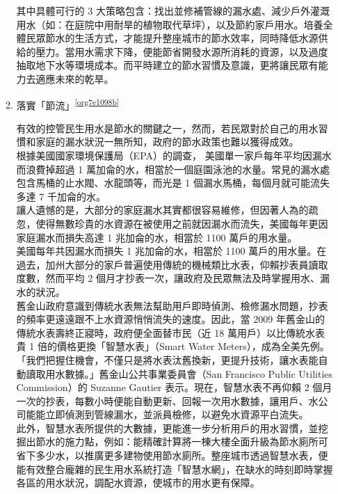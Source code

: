 \documentclass[a4paper,12pt]{article}
\begin{document}
\begin{enumerate}
\begin{enumerate}
其中具體可行的 3 大策略包含：找出並修補管線的漏水處、減少戶外灌溉用水（如：在庭院中用耐旱的植物取代草坪），以及節約家戶用水。培養全體民眾節水的生活方式，才能提升整座城市的節水效率，同時降低水源供給的壓力。當用水需求下降，便能節省開發水源所消耗的資源，以及過度抽取地下水等環境成本。而平時建立的節水習慣及意識，更將讓民眾有能力去適應未來的乾旱。\\

\item 落實「節流」\textsuperscript{\ref{org7e1098b}}
\label{sec:org08d655e}

有效的控管民生用水是節水的關鍵之一，然而，若民眾對於自己的用水習慣和家庭的漏水狀況一無所知，政府的節水政策也難以獲得成效。\\

根據美國國家環境保護局（EPA）的調查， 美國單一家戶每年平均因漏水而浪費掉超過 1 萬加侖的水，相當於一個庭園泳池的水量。常見的漏水處包含馬桶的止水閥、水龍頭等，而光是 1 個漏水馬桶，每個月就可能流失多達 7 千加侖的水。\\

讓人遺憾的是，大部分的家庭漏水其實都很容易維修，但因著人為的疏忽，使得無數珍貴的水資源在被使用之前就因漏水而流失，美國每年更因家庭漏水而損失高達 1 兆加侖的水，相當於 1100 萬戶的用水量。\\

美國每年共因漏水而損失 1 兆加侖的水，相當於 1100 萬戶的用水量。在過去，加州大部分的家戶普遍使用傳統的機械類比水表，仰賴抄表員讀取度數，然而平均 2 個月才抄表一次，讓政府及民眾無法及時掌握用水、漏水的狀況。\\

舊金山政府意識到傳統水表無法幫助用戶即時偵測、檢修漏水問題，抄表的頻率更遠遠跟不上水資源悄悄流失的速度。因此，當 2009 年舊金山的傳統水表壽終正寢時，政府便全面替市民（近 18 萬用戶）以比傳統水表貴 1 倍的價格更換「智慧水表」（Smart Water Meters），成為全美先例。\\

「我們把握住機會，不僅只是將水表汰舊換新，更提升技術，讓水表能自動讀取用水數據。」舊金山公共事業委員會（San Francisco Public Utilities Commission）的 Suzanne Gautier 表示。現在，智慧水表不再仰賴 2 個月一次的抄表，每數小時便能自動更新、回報一次用水數據，讓用戶、水公司能能立即偵測到管線漏水，並派員檢修，以避免水資源平白流失。\\

此外，智慧水表所提供的大數據，更能進一步分析用戶的用水習慣，並挖掘出節水的施力點，例如：能精確計算將一棟大樓全面升級為節水廁所可省下多少水，以推廣更多建物使用節水廁所。整座城市透過智慧水表，便能有效整合龐雜的民生用水系統打造「智慧水網」，在缺水的時刻即時掌握各區的用水狀況，調配水資源，使城市的用水更有保障。\\


\end{enumerate}
\end{enumerate}
\end{document}
